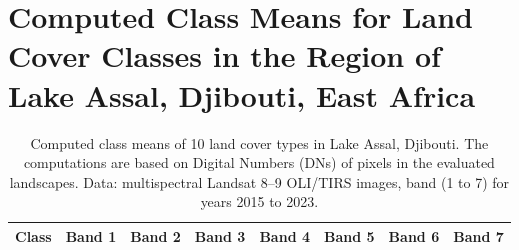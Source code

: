 \documentclass[jimaging,article,accept,pdftex,moreauthors]{Definitions/mdpi}
\begin{document}
\section[\appendixname~\thesection]{Computed Class Means for Land Cover Classes in the Region of Lake Assal, Djibouti, East Africa}\label{AppD}

\vspace{-6pt}
\begin{table}[H]\small
\caption{Computed %
 class means of 10 land cover types in Lake Assal, Djibouti. The computations are based on Digital Numbers (DNs) of pixels in the evaluated landscapes. Data: multispectral Landsat 8--9 OLI/TIRS images, band (1 to 7) for years 2015 to 2023.} \label{tabAppD}

\begin{tabularx}{\textwidth}{CCCCCCCC}
\toprule \textbf{Class} & \textbf{Band 1} & \textbf{Band 2} & \textbf{Band 3} & \textbf{Band 4} & \textbf{Band 5} & \textbf{Band 6} & \textbf{Band 7} \\ \midrule 



\end{tabularx}
\end{table}
\end{document}
